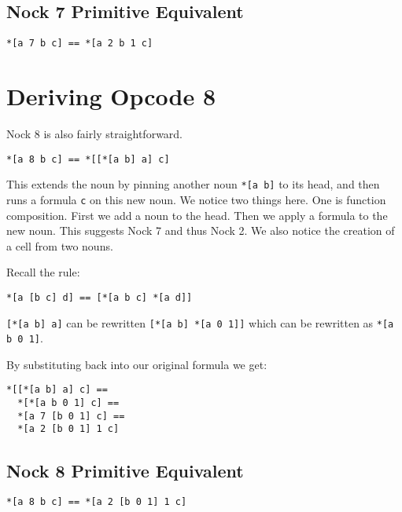 \documentclass[twoside]{article}
\begin{document}
\subsection*{Nock 7 Primitive Equivalent}

\begin{lstlisting}[style=listingcode]
*[a 7 b c] == *[a 2 b 1 c]
\end{lstlisting}

\section{Deriving Opcode 8}

Nock 8 is also fairly straightforward.

\begin{lstlisting}[style=listingcode]
*[a 8 b c] == *[[*[a b] a] c]
\end{lstlisting}

This extends the noun by pinning another noun \lstinline[style=inlinecode]{*[a b]} to its head, and then runs a formula \lstinline[style=inlinecode]{c} on this new noun. We notice two things here. One is function composition. First we add a noun to the head. Then we apply a formula to the new noun. This suggests Nock 7 and thus Nock 2. We also notice the creation of a cell from two nouns.

Recall the rule:

\begin{lstlisting}[style=listingcode]
*[a [b c] d] == [*[a b c] *[a d]]
\end{lstlisting}

\noindent
\lstinline[style=inlinecode]{[*[a b] a]} can be rewritten \lstinline[style=inlinecode]{[*[a b] *[a 0 1]]} which can be rewritten as \lstinline[style=inlinecode]{*[a b 0 1]}.

By substituting back into our original formula we get:

\begin{lstlisting}[style=listingblock]
*[[*[a b] a] c] ==
  *[*[a b 0 1] c] ==
  *[a 7 [b 0 1] c] ==
  *[a 2 [b 0 1] 1 c]
\end{lstlisting}

\subsection*{Nock 8 Primitive Equivalent}

\begin{lstlisting}[style=listingcode]
*[a 8 b c] == *[a 2 [b 0 1] 1 c]
\end{lstlisting}
\end{document}
